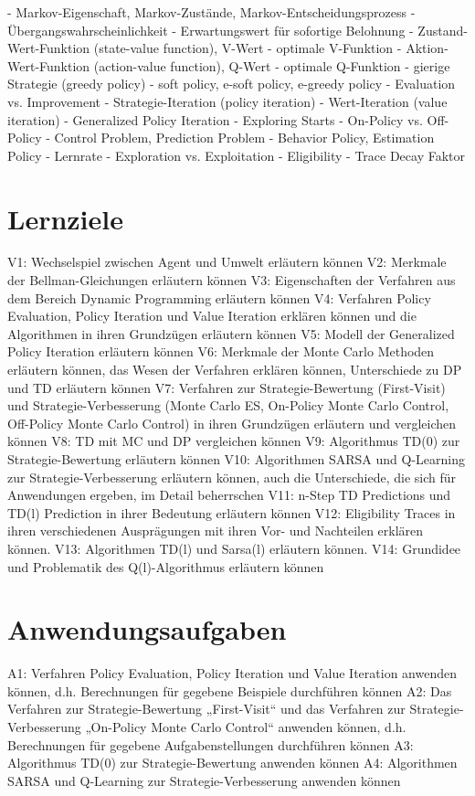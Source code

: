 \documentclass[10pt]{scrartcl}
\begin{document}
- Markov-Eigenschaft, Markov-Zustände, Markov-Entscheidungsprozess
- Übergangswahrscheinlichkeit
- Erwartungswert für sofortige Belohnung
- Zustand-Wert-Funktion (state-value function), V-Wert
- optimale V-Funktion
- Aktion-Wert-Funktion (action-value function), Q-Wert
- optimale Q-Funktion
- gierige Strategie (greedy policy)
- soft policy, e-soft policy, e-greedy policy
- Evaluation vs. Improvement
- Strategie-Iteration (policy iteration)
- Wert-Iteration (value iteration)
- Generalized Policy Iteration
- Exploring Starts
- On-Policy vs. Off-Policy
- Control Problem, Prediction Problem
- Behavior Policy, Estimation Policy
- Lernrate
- Exploration vs. Exploitation
- Eligibility
- Trace Decay Faktor

\section{Lernziele}
V1: Wechselspiel zwischen Agent und Umwelt erläutern können
V2: Merkmale der Bellman-Gleichungen erläutern können
V3: Eigenschaften der Verfahren aus dem Bereich Dynamic Programming erläutern
können
V4: Verfahren Policy Evaluation, Policy Iteration und Value Iteration erklären können und
die Algorithmen in ihren Grundzügen erläutern können
V5: Modell der Generalized Policy Iteration erläutern können
V6: Merkmale der Monte Carlo Methoden erläutern können, das Wesen der Verfahren
erklären können, Unterschiede zu DP und TD erläutern können
V7: Verfahren zur Strategie-Bewertung (First-Visit) und Strategie-Verbesserung (Monte
Carlo ES, On-Policy Monte Carlo Control, Off-Policy Monte Carlo Control) in ihren
Grundzügen erläutern und vergleichen können
V8: TD mit MC und DP vergleichen können
V9: Algorithmus TD(0) zur Strategie-Bewertung erläutern können
V10: Algorithmen SARSA und Q-Learning zur Strategie-Verbesserung erläutern können,
auch die Unterschiede, die sich für Anwendungen ergeben, im Detail beherrschen
V11: n-Step TD Predictions und TD(l) Prediction in ihrer Bedeutung erläutern können
V12: Eligibility Traces in ihren verschiedenen Ausprägungen mit ihren Vor- und Nachteilen
erklären können.
V13: Algorithmen TD(l) und Sarsa(l) erläutern können.
V14: Grundidee und Problematik des Q(l)-Algorithmus erläutern können

\section{Anwendungsaufgaben}
A1: Verfahren Policy Evaluation, Policy Iteration und Value Iteration anwenden können,
d.h. Berechnungen für gegebene Beispiele durchführen können
A2: Das Verfahren zur Strategie-Bewertung „First-Visit“ und das Verfahren zur Strategie-
Verbesserung „On-Policy Monte Carlo Control“ anwenden können, d.h. Berechnungen für
gegebene Aufgabenstellungen durchführen können
A3: Algorithmus TD(0) zur Strategie-Bewertung anwenden können
A4: Algorithmen SARSA und Q-Learning zur Strategie-Verbesserung anwenden können
\end{document}
